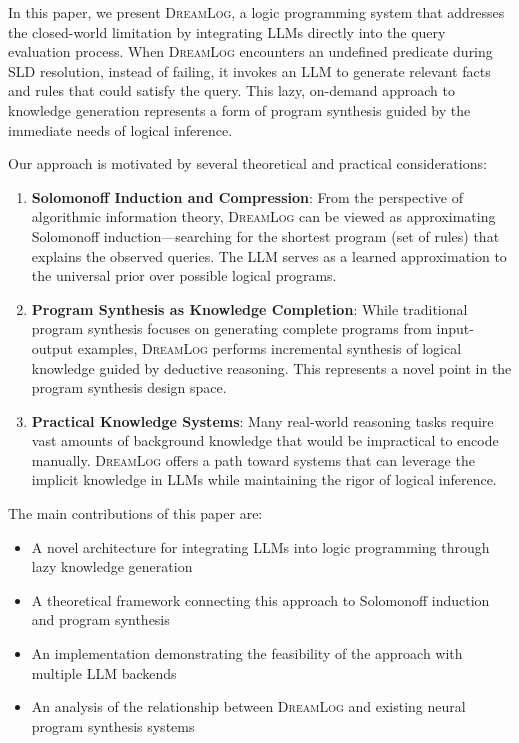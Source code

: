 \documentclass[11pt,a4paper]{article}
\newcommand{\dreamlog}{\textsc{DreamLog}}
\begin{document}
In this paper, we present \dreamlog{}, a logic programming system that addresses the closed-world limitation by integrating LLMs directly into the query evaluation process. When \dreamlog{} encounters an undefined predicate during SLD resolution, instead of failing, it invokes an LLM to generate relevant facts and rules that could satisfy the query. This lazy, on-demand approach to knowledge generation represents a form of program synthesis guided by the immediate needs of logical inference.

Our approach is motivated by several theoretical and practical considerations:

\begin{enumerate}[leftmargin=*]
\item \textbf{Solomonoff Induction and Compression}: From the perspective of algorithmic information theory, \dreamlog{} can be viewed as approximating Solomonoff induction---searching for the shortest program (set of rules) that explains the observed queries. The LLM serves as a learned approximation to the universal prior over possible logical programs.

\item \textbf{Program Synthesis as Knowledge Completion}: While traditional program synthesis focuses on generating complete programs from input-output examples, \dreamlog{} performs incremental synthesis of logical knowledge guided by deductive reasoning. This represents a novel point in the program synthesis design space.

\item \textbf{Practical Knowledge Systems}: Many real-world reasoning tasks require vast amounts of background knowledge that would be impractical to encode manually. \dreamlog{} offers a path toward systems that can leverage the implicit knowledge in LLMs while maintaining the rigor of logical inference.
\end{enumerate}

The main contributions of this paper are:
\begin{itemize}[leftmargin=*]
\item A novel architecture for integrating LLMs into logic programming through lazy knowledge generation
\item A theoretical framework connecting this approach to Solomonoff induction and program synthesis
\item An implementation demonstrating the feasibility of the approach with multiple LLM backends
\item An analysis of the relationship between \dreamlog{} and existing neural program synthesis systems
\end{itemize}
\end{document}
